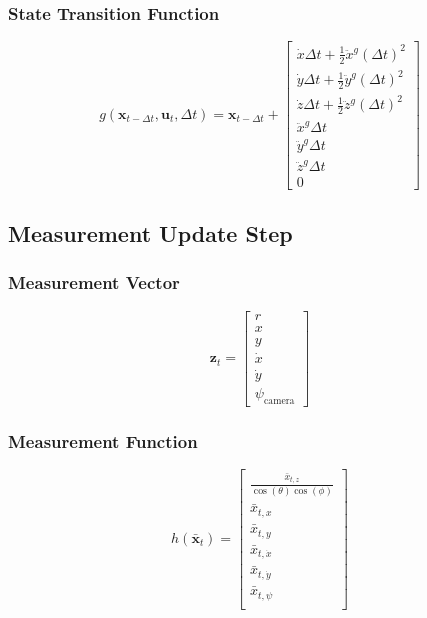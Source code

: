 \documentclass{article}
\begin{document}
\subsubsection{State Transition Function}

\begin{equation}
  g(\mathbf{x}_{t-\Delta t}, \mathbf{u}_t, \Delta t) = \mathbf{x}_{t-\Delta t} + \begin{bmatrix}
    \dot x \Delta t + \frac{1}{2} \ddot x^g(\Delta t)^2 \\
    \dot y \Delta t + \frac{1}{2} \ddot y^g(\Delta t)^2 \\
    \dot z \Delta t + \frac{1}{2} \ddot z^g(\Delta t)^2 \\
    \ddot x^g\Delta t\\
    \ddot y^g\Delta t\\
    \ddot z^g\Delta t\\
    0
  \end{bmatrix}
\end{equation}

\subsection{Measurement Update Step}

\subsubsection{Measurement Vector}

\begin{equation}
\mathbf{z}_t = \begin{bmatrix}
r \\
x \\
y \\
\dot x \\
\dot y \\
\psi_{\text{camera}}
\end{bmatrix}
\end{equation}

\subsubsection{Measurement Function}

\begin{equation}
  h(\mathbf{\bar x}_t) = \begin{bmatrix}
      \frac{\bar x_{t, z}}{\cos(\theta)\cos(\phi)} \\
      \bar x_{t, x} \\
      \bar x_{t, y} \\
      \bar x_{t, \dot x} \\
      \bar x_{t, \dot y} \\
      \bar x_{t, \psi} \\
  \end{bmatrix}
\end{equation}
\end{document}
